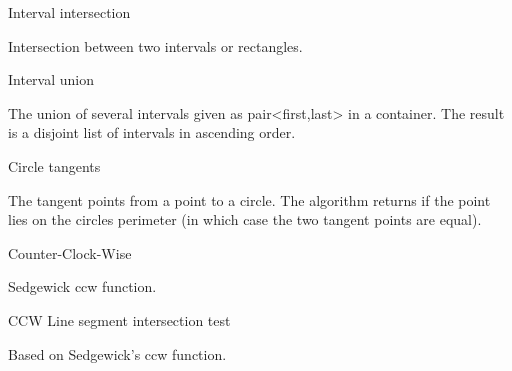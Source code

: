 \begin{algorithm}{Interval intersection}

\desc
Intersection between two intervals or rectangles.
\end{algorithm}

\begin{algorithm}{Interval union}

\desc
The union of several intervals given as pair<first,last> in a container. The
result is a disjoint list of intervals in ascending order.
\end{algorithm}

\begin{algorithm}{Circle tangents}

\desc
The tangent points from a point to a circle. The algorithm returns if
the point lies on the circles perimeter (in which case the two tangent
points are equal).
\end{algorithm}

\begin{algorithm}{Counter-Clock-Wise}

\desc
Sedgewick ccw function.
\end{algorithm}

\begin{algorithm}{CCW Line segment intersection test}

\desc
Based on Sedgewick's ccw function.
\end{algorithm}
